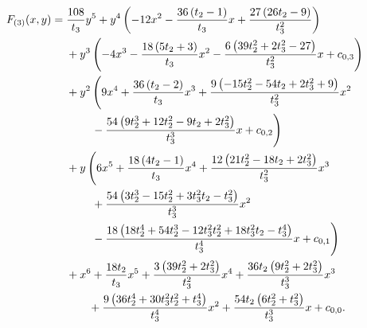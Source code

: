 \begin{align}
    \label{curve:potts_free}
    F_{(3)}(x,y)={} & \frac{108}{t_3}y^{5}{}+y^{4}\left(-12x^{2} - \frac{36 \left(t_2-1\right)}{t_3}x + \frac{27 \left(26 t_2-9\right)}{t_3^2}\right)\notag \\
                    & {}+y^{3}\left(-4x^{3} - \frac{18 \left(5 t_2+3\right)}{t_3}x^{2} - \frac{6 \left(39 t_2^2+2 t_3^2-27\right)}{t_3^2}x + c_{0,3}\right)\notag \\
                    & {}+y^{2}\left(9x^{4} + \frac{36 \left(t_2-2\right)}{t_3}x^{3} + \frac{9 \left(-15 t_2^2-54 t_2+2 t_3^2+9\right)}{t_3^2}x^{2}\right.\notag \\*
                    & \qquad{}\left.{}- \frac{54 \left(9 t_2^3+12 t_2^2-9 t_2+2 t_3^2\right)}{t_3^3}x + c_{0,2}\right)\notag \\
                    & {}+y\left(6x^{5} + \frac{18 \left(4 t_2-1\right)}{t_3}x^{4} + \frac{12 \left(21 t_2^2-18 t_2+2 t_3^2\right)}{t_3^2}x^{3}\right.\notag \\*
                    & \qquad{}\left.{}+ \frac{54 \left(3 t_2^3-15 t_2^2+3 t_3^2 t_2-t_3^2\right)}{t_3^3}x^{2}\right.\notag \\*
                    & \qquad{}\left.{}- \frac{18 \left(18 t_2^4+54 t_2^3-12 t_3^2 t_2^2+18 t_3^2 t_2-t_3^4\right)}{t_3^4}x + c_{0,1}\right)\notag \\
                    & {}+x^{6} + \frac{18 t_2}{t_3}x^{5} + \frac{3 \left(39 t_2^2+2 t_3^2\right)}{t_3^2}x^{4} + \frac{36 t_2 \left(9 t_2^2+2 t_3^2\right)}{t_3^3}x^{3}\notag \\
                    & \qquad{}+ \frac{9 \left(36 t_2^4+30 t_3^2 t_2^2+t_3^4\right)}{t_3^4}x^{2} + \frac{54 t_2 \left(6 t_2^2+t_3^2\right)}{t_3^3}x + c_{0,0}.
\end{align}
